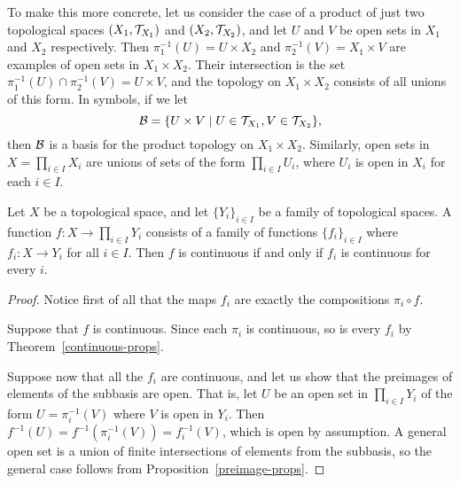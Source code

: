 To make this more concrete, let us consider the case of a product of just two topological spaces $(X_1,\mathcal{T}_{X_1})$ and $(X_2,\mathcal{T}_{X_2})$, and let $U$ and $V$ be open sets in $X_1$ and $X_2$ respectively. Then $\pi_1^{-1}(U) = U \times X_2$ and $\pi_2^{-1}(V) = X_1 \times V$ are examples of open sets in $X_1 \times X_2$. Their intersection is the set $\pi_1^{-1}(U) \cap \pi_2^{-1}(V) = U \times V$, and the topology on $X_1 \times X_2$ consists of all unions of this form. In symbols, if we let
\[
  \mathcal{B} = \{ U \times V \mid U \in \mathcal{T}_{X_1}, V \in \mathcal{T}_{X_2} \},
\]
then $\mathcal{B}$ is a basis for the product topology on $X_1 \times X_2$. Similarly, open sets in $X = \prod_{i \in I} X_i$ are unions of sets of the form $\prod_{i \in I} U_i$, where $U_i$ is open in $X_i$ for each $i \in I$.

\begin{thm}
  Let $X$ be a topological space, and let $\{Y_i\}_{i \in I}$ be a family of topological spaces. A function $f : X \to \prod_{i \in I} Y_i$ consists of a family of functions $\{f_i\}_{i \in I}$ where $f_i : X \to Y_i$ for all $i \in I$. Then $f$ is continuous if and only if $f_i$ is continuous for every $i$.
\end{thm}
\begin{proof}
  Notice first of all that the maps $f_i$ are exactly the compositions $\pi_i \circ f$.
  
  Suppose that $f$ is continuous. Since each $\pi_i$ is continuous, so is every $f_i$ by Theorem~\ref{continuous-props}.
  
  Suppose now that all the $f_i$ are continuous, and let us show that the preimages of elements of the subbasis are open. That is, let $U$ be an open set in $\prod_{i \in I} Y_i$ of the form $U = \pi_i^{-1}(V)$ where $V$ is open in $Y_i$. Then $f^{-1}(U) = f^{-1}(\pi_i^{-1}(V)) = f_i^{-1}(V)$, which is open by assumption. A general open set is a union of finite intersections of elements from the subbasis, so the general case follows from Proposition~\ref{preimage-props}.
\end{proof}


